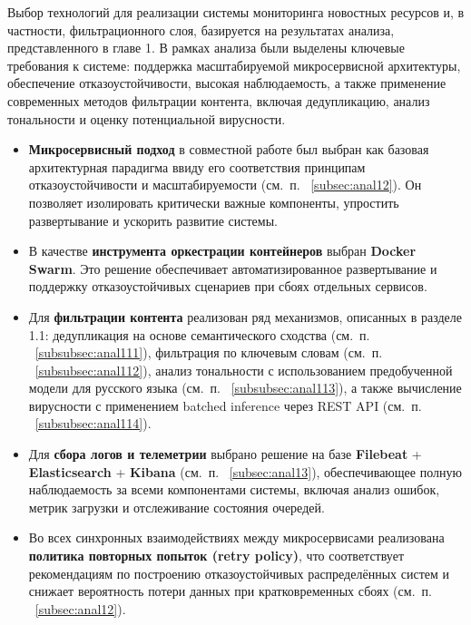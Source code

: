 \newpage


Выбор технологий для реализации системы мониторинга новостных ресурсов и, в частности, фильтрационного слоя, базируется на результатах анализа, представленного в главе 1.
В рамках анализа были выделены ключевые требования к системе: поддержка масштабируемой микросервисной архитектуры, обеспечение отказоустойчивости, высокая наблюдаемость, а также применение современных методов фильтрации контента, включая дедупликацию, анализ тональности и оценку потенциальной вирусности.
\begin{itemize}
    \item \textbf{Микросервисный подход} в совместной работе был выбран как базовая архитектурная парадигма ввиду его соответствия принципам отказоустойчивости и масштабируемости (см.\ п. ~\ref{subsec:anal12}).
    Он позволяет изолировать критически важные компоненты, упростить развертывание и ускорить развитие системы.
    \item В качестве \textbf{инструмента оркестрации контейнеров} выбран \textbf{Docker Swarm}.
    Это решение обеспечивает автоматизированное развертывание и поддержку отказоустойчивых сценариев при сбоях отдельных сервисов.
    \item Для \textbf{фильтрации контента} реализован ряд механизмов, описанных в разделе 1.1: дедупликация на основе семантического сходства (см.\ п. ~\ref{subsubsec:anal111}), фильтрация по ключевым словам (см.\ п. ~\ref{subsubsec:anal112}), анализ тональности с использованием предобученной модели для русского языка (см.\ п. ~\ref{subsubsec:anal113}), а также вычисление вирусности с применением batched inference через REST API (см.\ п. ~\ref{subsubsec:anal114}).
    \item Для \textbf{сбора логов и телеметрии} выбрано решение на базе \textbf{Filebeat} + \textbf{Elasticsearch} + \textbf{Kibana} (см.\ п. ~\ref{subsec:anal13}), обеспечивающее полную наблюдаемость за всеми компонентами системы, включая анализ ошибок, метрик загрузки и отслеживание состояния очередей.
    \item Во всех синхронных взаимодействиях между микросервисами реализована \textbf{политика повторных попыток (retry policy)}, что соответствует рекомендациям по построению отказоустойчивых распределённых систем и снижает вероятность потери данных при кратковременных сбоях (см.\ п. ~\ref{subsec:anal12}).
\end{itemize}

